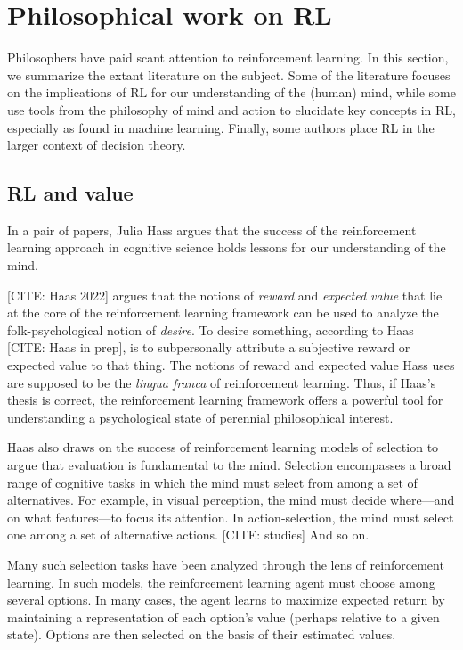 \section{Philosophical work on RL}

Philosophers have paid scant attention to reinforcement learning.
In this section, we summarize the extant literature on the subject.
Some of the literature focuses on the implications of RL for our understanding of the (human) mind, while some use tools from the philosophy of mind and action to elucidate key concepts in RL, especially as found in machine learning.
Finally, some authors place RL in the larger context of decision theory.

\subsection{RL and value}
In a pair of papers, Julia Hass argues that the success of the reinforcement learning approach in cognitive science holds lessons for our understanding of the mind.

[CITE: Haas 2022] argues that the notions of \emph{reward} and \emph{expected value} that lie at the core of the reinforcement learning framework can be used to analyze the folk-psychological notion of \emph{desire}.
To desire something, according to Haas [CITE: Haas in prep], is to subpersonally attribute a subjective reward or expected value to that thing.
The notions of reward and expected value Hass uses are supposed to be the \emph{lingua franca} of reinforcement learning.
Thus, if Haas's thesis is correct, the reinforcement learning framework offers a powerful tool for understanding a psychological state of perennial philosophical interest.

Haas also draws on the success of reinforcement learning models of selection to argue that evaluation is fundamental to the mind.
Selection encompasses a broad range of cognitive tasks in which the mind must select from among a set of alternatives.
For example, in visual perception, the mind must decide where---and on what features---to focus its attention.
In action-selection, the mind must select one among a set of alternative actions.
[CITE: studies]
And so on.

Many such selection tasks have been analyzed through the lens of reinforcement learning.
In such models, the reinforcement learning agent must choose among several options.
In many cases, the agent learns to maximize expected return by maintaining a representation of each option's value (perhaps relative to a given state).
Options are then selected on the basis of their estimated values.

